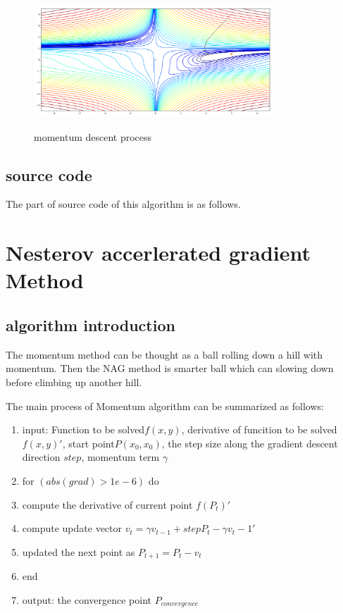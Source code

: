\documentclass[aps,letterpaper,10pt]{article}
\begin{document}
	\begin{figure}[H]
	  \centering
	  \label{fig:momentum}\includegraphics[width=0.8\textwidth]{momentum.png}\
	  \caption{momentum descent process}
	\end{figure}

\subsection{source code}
The part of source code of this algorithm is as follows.  \vspace{5mm}
	
	\vspace{3mm}


\newpage
\section{Nesterov accerlerated gradient Method}
\subsection{algorithm introduction}
  The momentum method can be thought as a ball rolling down a hill with momentum. Then the NAG method is smarter ball which can slowing down before climbing up another hill.\vspace{3mm}

  The main process of Momentum algorithm can be summarized as follows:
\begin{enumerate}
	\item input: Function to be solved$f(x,y)$, derivative of funcition to be solved${f(x,y)}'$, start point$P(x_0,x_0)$, the step size along the gradient descent direction $step$, momentum term $\gamma$
	\item for $(abs(grad)> 1e-6)$ do
	\item compute the derivative of current point ${f(P_t)}'$
  \item compute update vector $v_t=\gamma v_{t-1} + step{P_t-\gamma v_t-1}'$
	\item updated the next point as $P_{t+1}=P_t - v_t$
  \item end
	\item output: the convergence point $P_{convergence}$
\end{enumerate}
\end{document}
